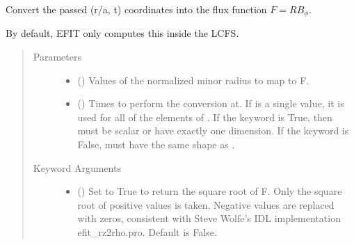 \documentclass[letterpaper,10pt,english]{sphinxmanual}
\begin{document}
\begin{fulllineitems}
\begin{fulllineitems}
\end{fulllineitems}


\begin{fulllineitems}
\label{\detokenize{eqtools:eqtools.core.Equilibrium.roa2F}}
Convert the passed (r/a, t) coordinates into the flux function \(F=RB_{\phi}\).

By default, EFIT only computes this inside the LCFS.
\begin{quote}\begin{description}
\item[{Parameters}] \leavevmode\begin{itemize}
\item {} 
 () \textendash{} Values of the normalized minor
radius to map to F.

\item {} 
 () \textendash{} Times to perform the conversion at.
If  is a single value, it is used for all of the elements of
. If the  keyword is True, then  must be scalar
or have exactly one dimension. If the  keyword is False,
 must have the same shape as .

\end{itemize}

\item[{Keyword Arguments}] \leavevmode\begin{itemize}
\item {} 
 () \textendash{} Set to True to return the square root of F.
Only the square root of positive values is taken. Negative
values are replaced with zeros, consistent with Steve Wolfe’s
IDL implementation efit\_rz2rho.pro. Default is False.


\end{itemize}
\end{description}
\end{quote}
\end{fulllineitems}
\end{fulllineitems}
\end{document}
